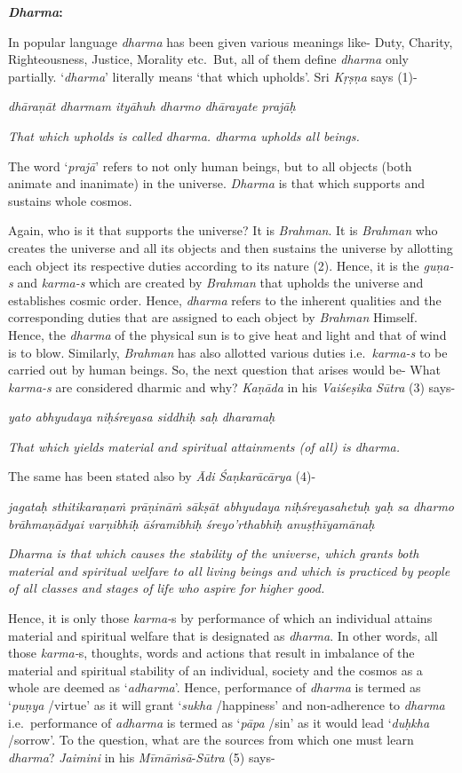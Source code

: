\textbf{\emph{Dharma}:}

In popular language \emph{dharma} has been given various meanings like- Duty, Charity, Righteousness, Justice, Morality etc.\ But, all of them define \emph{dharma} only partially. `\emph{dharma}' literally means `that which upholds'. Sri \emph{Kṛṣṇa} says (1)-
\newpage

\emph{dhāraṇāt dharmam ityāhuh dharmo dhārayate prajāḥ }

\emph{That which upholds is called dharma. dharma upholds all beings.}

The word `\emph{prajā}' refers to not only human beings, but to all objects (both animate and inanimate) in the universe. \emph{Dharma} is that which supports and sustains whole cosmos.

Again, who is it that supports the universe? It is \emph{Brahman}. It is \emph{Brahman} who creates the universe and all its objects and then sustains the universe by allotting each object its respective duties according to its nature (2). Hence, it is the \emph{guṇa-s} and \emph{karma-s} which are created by \emph{Brahman} that upholds the universe and establishes cosmic order. Hence, \emph{dharma} refers to the inherent qualities and the corresponding duties that are assigned to each object by \emph{Brahman} Himself. Hence, the \emph{dharma} of the physical sun is to give heat and light and that of wind is to blow. Similarly, \emph{Brahman} has also allotted various duties i.e.\ \emph{karma-s} to be carried out by human beings. So, the next question that arises would be- What \emph{karma-s} are considered dharmic and why? \emph{Kaṇāda} in his \emph{Vaiśeṣika} \emph{Sūtra} (3) says-

\emph{yato abhyudaya niḥśreyasa siddhiḥ saḥ dharamaḥ }

\emph{That which yields material and spiritual attainments (of all) is dharma.}

The same has been stated also by \emph{Ādi} \emph{Śaṇkarācārya} (4)-

\emph{jagataḥ sthitikaraṇaṁ prāṇināṁ sākṣāt abhyudaya niḥśreyasahetuḥ yaḥ sa dharmo brāhmaṇādyai varṇibhiḥ āśramibhiḥ śreyo'rthabhiḥ anuṣṭhīyamānaḥ }

\emph{Dharma is that which causes the stability of the universe, which grants both material and spiritual welfare to all living beings and which is practiced by people of all classes and stages of life who aspire for higher good. }

Hence, it is only those \emph{karma-}s by performance of which an individual attains material and spiritual welfare that is designated as \emph{dharma}. In other words, all those \emph{karma-}s, thoughts, words and actions that result in imbalance of the material and spiritual stability of an individual, society and the cosmos as a whole are deemed as `\emph{adharma}'. Hence, performance of \emph{dharma} is termed as `\emph{puṇya} /virtue' as it will grant `\emph{sukha} /happiness' and non-adherence to \emph{dharma} i.e.\ performance of \emph{adharma} is termed as `\emph{pāpa} /sin' as it would lead `\emph{duḥkha} /sorrow'. To the question, what are the sources from which one must learn \emph{dharma}? \emph{Jaimini} in his \emph{Mīmāṁsā}-\emph{Sūtra} (5) says-

